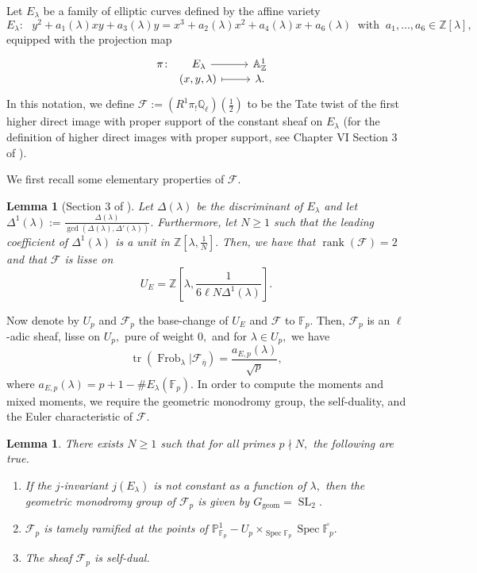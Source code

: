 \documentclass[12pt]{amsart}
\newtheorem{lemma}[theorem]{Lemma}
\theoremstyle{definition}
\theoremstyle{remark}
\numberwithin{equation}{section}
\def\A{\mathbb A}
\def\F{{\mathbb F}}
\def\Z{{\mathbb Z}}
\def\Q{{\mathbb Q}}
\def\Z{\mathbb{Z}}
\def\Q{\mathbb{Q}}
\def\F{\mathbb{F}}
\DeclareMathOperator{\Spec}{Spec}
\DeclareMathOperator{\Frob}{Frob}
\DeclareMathOperator{\tr}{tr}
\DeclareMathOperator{\rank}{rank}
\DeclareMathOperator{\geom}{geom}
\DeclareMathOperator{\SL}{SL}
\begin{document}
Let $E_{\lambda}$ be a family of elliptic curves defined by the affine variety
$$
E_{\lambda}:\ \ \ y^2+a_1(\lambda)xy+a_3(\lambda)y=x^3+a_2(\lambda)x^2+a_4(\lambda)x+a_6(\lambda)\ \text{ with } \ a_1,\ldots,a_6\in\Z[\lambda],
$$
equipped with the projection map
$$
\begin{tikzcd}[row sep=-4pt, column sep= normal]
 \pi\colon\!\ \ \ \ \ \   E_\lambda \arrow[r] & \A_\Z^1 \\
\ \ \ \ \ \ \quad (x,y,\lambda) \arrow[r, maps to] & \lambda .   
\end{tikzcd}
$$
In this notation, we define $\mathcal{F}:=(R^1\pi_!\Q_\ell)(\frac{1}{2})$ to be the Tate twist of the first higher direct image with proper support of the constant sheaf on $E_\lambda$ (for the definition of higher direct images with proper support, see Chapter VI Section 3 of \cite{ECMilneBook}). 

We first recall some elementary properties of $\mathcal{F}.$

\begin{lemma}[Section 3 of \cite{RangMoyen}]\label{FLisse}
    Let $\Delta(\lambda)$ be the discriminant of $E_\lambda$ and let $\Delta^1(\lambda):=\frac{\Delta(\lambda)}{\gcd(\Delta(\lambda),\Delta'(\lambda))}.$ Furthermore, let $N\geq 1$ such that the leading coefficient of $\Delta^1(\lambda)$ is a unit in $\Z[\lambda,\frac{1}{N}].$ Then,  we have that $\rank(\mathcal{F})=2$ and that $\mathcal{F}$ is lisse on
    $$
    U_E=\Z\left[\lambda,\frac{1}{6\ell N\Delta^1(\lambda)}\right].
    $$
\end{lemma}

Now denote by $U_{p}$ and $\mathcal{F}_p$ the base-change of $U_E$ and $\mathcal{F}$ to $\F_p.$ Then, $\mathcal{F}_p$ is an $\ell$-adic sheaf, lisse on $U_p,$ pure of weight $0,$ and for $\lambda\in U_p,$ we have
\begin{equation}\label{traceF}
\tr(\Frob_\lambda|\mathcal{F}_{\overline{\eta}}) = \frac{a_{E,p}(\lambda)}{\sqrt{p}},
\end{equation}
where $a_{E,p}(\lambda) = p+1-\#E_\lambda(\F_p).$ In order to compute the moments and mixed moments, we require the geometric monodromy group, the self-duality, and the Euler characteristic of $\mathcal{F}.$

\begin{lemma}\label{FMonoChar}
    There exists $N\geq 1$ such that for all primes $p\nmid N,$ the following are true.
    \begin{enumerate}
        \item If the $j$-invariant $j(E_\lambda)$ is not constant as a function of $\lambda,$ then the geometric monodromy group of $\mathcal{F}_p$ is given by $G_{\geom}=\SL_2.$
        \item $\mathcal{F}_p$ is tamely ramified at the points of $\mathbb{P}^1_{\F_p}-U_p\times_{\Spec\F_p}\Spec\overline{\F_p}.$
        \item The sheaf $\mathcal{F}_p$ is self-dual.
    \end{enumerate}
\end{lemma}
\end{document}
